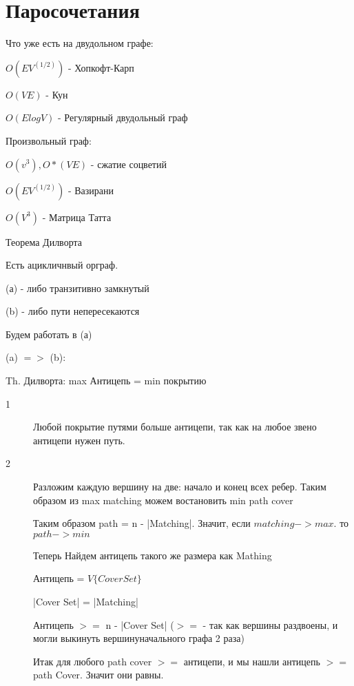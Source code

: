 ﻿\section{Паросочетания}

Что уже есть на двудольном графе:

$O(E V^(1/2))$ - Хопкофт-Карп

$O(VE)$ - Кун

$O(E log{V})$ - Регулярный двудольный граф

Произвольный граф:

$O(v^3), O*(VE)$ - сжатие соцветий

$O(E V^(1/2))$ - Вазирани

$O(V^3)$ - Матрица Татта

\begin{theorem}{Теорема Дилворта}
\end{theorem}
\begin{lemma}{}
Есть ацикличнвый орграф.

(а) - либо транзитивно замкнутый

(b) - либо пути непересекаются

Будем работать в (а)

(a) $=>$ (b):


\end{lemma}

Th. Дилворта: max Антицепь = min покрытию
\begin{description}
\item[1] 

Любой покрытие путями больше антицепи, так как на любое звено антицепи нужен путь.

\item[2] 
Разложим каждую вершину на две: начало и конец всех ребер. Таким образом из  max matching можем востановить min path cover



Таким образом path = n - |Matching|. Значит, если $matching -> max$. то $path -> min$

Теперь Найдем антицепь такого же размера как Mathing

Антицепь = $V\{Cover Set\}$



|Cover Set| = |Matching|

Антицепь $>=$ n - |Cover Set|  ($>=$ - так как вершины раздвоены, и могли выкинуть вершинуначального графа 2 раза)

Итак для любого path cover $>=$ антицепи, и мы нашли антицепь $>=$ path Cover. Значит они равны.
\end{description}

